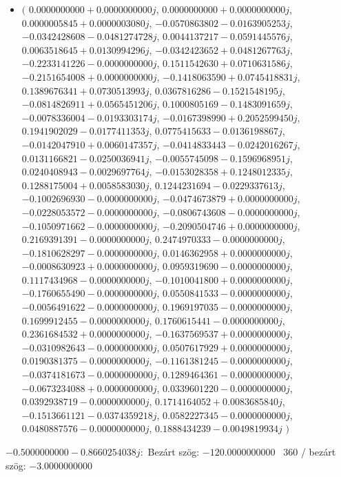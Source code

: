 \documentclass[14pt,a4paper]{article}
\begin{document}
\begin{itemize}
\item
$\big($
$0.0000000000+0.0000000000j$, $0.0000000000+0.0000000000j$, $0.0000005845+0.0000003080j$, $-0.0570863802-0.0163905253j$, $-0.0342428608-0.0481274728j$, $0.0044137217-0.0591445576j$, $0.0063518645+0.0130994296j$, $-0.0342423652+0.0481267763j$, $-0.2233141226-0.0000000000j$, $0.1511542630+0.0710631586j$, $-0.2151654008+0.0000000000j$, $-0.1418063590+0.0745418831j$, $0.1389676341+0.0730513993j$, $0.0367816286-0.1521548195j$, $-0.0814826911+0.0565451206j$, $0.1000805169-0.1483091659j$, $-0.0078336004-0.0193303174j$, $-0.0167398990+0.2052599450j$, $0.1941902029-0.0177411353j$, $0.0775415633-0.0136198867j$, $-0.0142047910+0.0060147357j$, $-0.0414833443-0.0242016267j$, $0.0131166821-0.0250036941j$, $-0.0055745098-0.1596968951j$, $0.0240408943-0.0029697764j$, $-0.0153028358+0.1248012335j$, $0.1288175004+0.0058583030j$, $0.1244231694-0.0229337613j$, $-0.1002696930-0.0000000000j$, $-0.0474673879+0.0000000000j$, $-0.0228053572-0.0000000000j$, $-0.0806743608-0.0000000000j$, $-0.1050971662-0.0000000000j$, $-0.2090504746+0.0000000000j$, $0.2169391391-0.0000000000j$, $0.2474970333-0.0000000000j$, $-0.1810628297-0.0000000000j$, $0.0146362958+0.0000000000j$, $-0.0008630923+0.0000000000j$, $0.0959319690-0.0000000000j$, $0.1117434968-0.0000000000j$, $-0.1010041800+0.0000000000j$, $-0.1760655490-0.0000000000j$, $0.0550841533-0.0000000000j$, $-0.0056491622-0.0000000000j$, $0.1969197035-0.0000000000j$, $0.1699912455-0.0000000000j$, $0.1760615441-0.0000000000j$, $0.2361684532+0.0000000000j$, $-0.1637569537+0.0000000000j$, $-0.0310982643-0.0000000000j$, $0.0507617929+0.0000000000j$, $0.0190381375-0.0000000000j$, $-0.1161381245-0.0000000000j$, $-0.0374181673-0.0000000000j$, $0.1289464361-0.0000000000j$, $-0.0673234088+0.0000000000j$, $0.0339601220-0.0000000000j$, $0.0392938719-0.0000000000j$, $0.1714164052+0.0083685840j$, $-0.1513661121-0.0374359218j$, $0.0582227345-0.0000000000j$, $0.0480887576-0.0000000000j$, $0.1888434239-0.0049819934j$
$\big)$
\end{itemize}
$-0.5000000000-0.8660254038j$:\
Bezárt szög: $-120.0000000000$ \
360 / bezárt szög: $-3.0000000000$\
\end{document}
